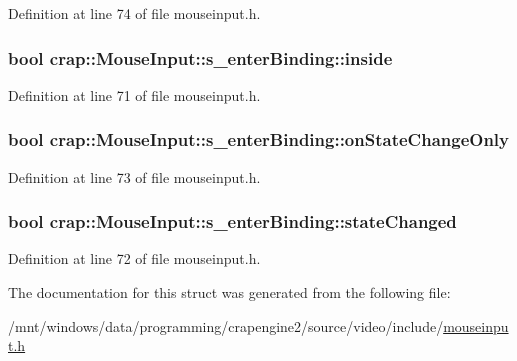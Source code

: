 Definition at line 74 of file mouseinput.\+h.

\hypertarget{structcrap_1_1_mouse_input_1_1s__enter_binding_a6f6172646c989b4a7a69ae49ce4e2261}{}
\subsubsection[{inside}]{\setlength{\rightskip}{0pt plus 5cm}bool crap\+::\+Mouse\+Input\+::s\+\_\+enter\+Binding\+::inside}\label{structcrap_1_1_mouse_input_1_1s__enter_binding_a6f6172646c989b4a7a69ae49ce4e2261}


Definition at line 71 of file mouseinput.\+h.

\hypertarget{structcrap_1_1_mouse_input_1_1s__enter_binding_a117ebc1fa82e0c995ff658ec489bec8a}{}
\subsubsection[{on\+State\+Change\+Only}]{\setlength{\rightskip}{0pt plus 5cm}bool crap\+::\+Mouse\+Input\+::s\+\_\+enter\+Binding\+::on\+State\+Change\+Only}\label{structcrap_1_1_mouse_input_1_1s__enter_binding_a117ebc1fa82e0c995ff658ec489bec8a}


Definition at line 73 of file mouseinput.\+h.

\hypertarget{structcrap_1_1_mouse_input_1_1s__enter_binding_a9a9cf1d85c415d3df678446429666c22}{}
\subsubsection[{state\+Changed}]{\setlength{\rightskip}{0pt plus 5cm}bool crap\+::\+Mouse\+Input\+::s\+\_\+enter\+Binding\+::state\+Changed}\label{structcrap_1_1_mouse_input_1_1s__enter_binding_a9a9cf1d85c415d3df678446429666c22}


Definition at line 72 of file mouseinput.\+h.



The documentation for this struct was generated from the following file\+:\begin{DoxyCompactItemize}
\item 
/mnt/windows/data/programming/crapengine2/source/video/include/\hyperlink{mouseinput_8h}{mouseinput.\+h}\end{DoxyCompactItemize}
